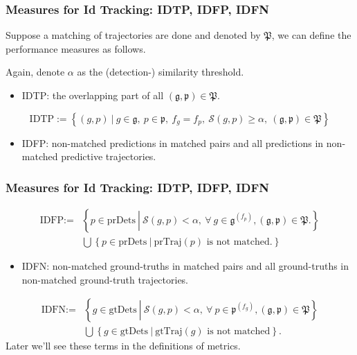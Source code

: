 \documentclass[slidetop, mathserif]{beamer}
\begin{document}
\begin{frame}
	\frametitle{Measures for Id Tracking: IDTP, IDFP, IDFN}
	
	Suppose a matching of trajectories are done and denoted by $\mathfrak P$,
	we can define the performance measures as follows.
	
	\vspace{4pt}
	
	Again, denote $\alpha$ as the (detection-) similarity threshold.
	\begin{itemize}
		\item IDTP:
		      the overlapping part of all $(\mathfrak g, \mathfrak p) \in \mathfrak P$.
	\end{itemize}
	
	\vspace{-15pt}
	\[
		\text{IDTP} := \left\{ (g,p)\ |\ 
		g\in\mathfrak g, ~ p\in\mathfrak p, ~
		f_g=f_p, ~ 
		\mathcal S(g,p) \geq \alpha, ~ 
		(\mathfrak g, \mathfrak p)\in\mathfrak P
		\right\}
	\]
	\vspace{-10pt}
	\begin{itemize}
		\item IDFP:
		      non-matched predictions in matched pairs
		      and all predictions in non-matched predictive trajectories.
	\end{itemize}
	    
\end{frame}

\begin{frame}
	\frametitle{Measures for Id Tracking: IDTP, IDFP, IDFN}
	    
	\vspace{-10pt}

	\begin{align*}
		\text{IDFP} := & \left\{ p\in\text{prDets}\ \left|\                                                
		\mathcal S(g,p)<\alpha, \ 
		\forall\ g\in\mathfrak g^{(f_p)},
		(\mathfrak g,\mathfrak p)\in\mathfrak P.
		\right.
		\right\} \\
		               & \bigcup \left\{p \in \text{prDets}\ |\ \text{prTraj$(p)$ is not matched.}\right\} 
	\end{align*}
	
	\vspace{-10pt}
	\begin{itemize}
		\item IDFN:
		      non-matched ground-truths in matched pairs and
		      all ground-truths in non-matched ground-truth trajectories.
	\end{itemize}
	\begin{align*}
		\text{IDFN} := & \left\{ g\in\text{gtDets}\ \left|\                                                
		\mathcal S(g,p)<\alpha, \ 
		\forall\ p\in\mathfrak p^{(f_g)},
		(\mathfrak g,\mathfrak p)\in\mathfrak P
		\right.
		\right\} \\
		               & \bigcup \left\{g \in \text{gtDets}\ |\ \text{gtTraj$(g)$ is not matched}\right\}. 
	\end{align*}
	Later we'll see these terms in the definitions of metrics.
\end{frame}
\end{document}
